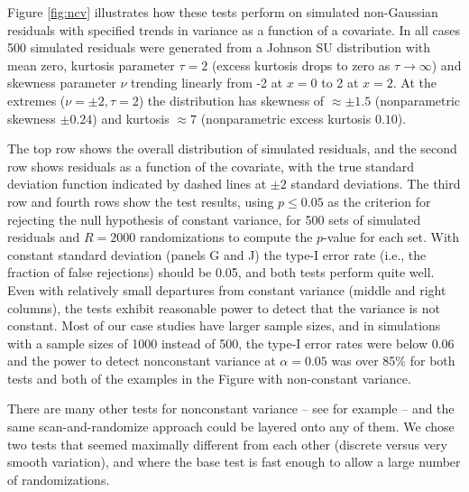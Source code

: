 \documentclass[12pt]{article}
\begin{document}
Figure \ref{fig:ncv} illustrates how these tests perform on simulated non-Gaussian residuals with specified trends in variance as a function of a covariate.
In all cases 500 simulated residuals were generated from a Johnson SU distribution with mean zero, kurtosis parameter $\tau = 2$ (excess kurtosis drops to zero as $\tau \to \infty$)
and skewness parameter $\nu$ trending linearly from -2 at $x=0$ to 2 at $x=2$. At the extremes ($\nu =\pm 2, \tau=2$) the distribution has skewness of $\approx \pm 1.5$
(nonparametric skewness $\pm 0.24$) and kurtosis $\approx 7$ (nonparametric excess kurtosis $0.10$).   

The top row shows the overall distribution of simulated residuals, and the second row shows residuals as a function of the covariate, with the true standard deviation 
function indicated by dashed lines at $\pm 2$ standard deviations. 
The third row and fourth rows show the test results, using $p \le 0.05$ as the criterion for rejecting the null hypothesis
of constant variance, for 500 sets of simulated residuals and $R=2000$ randomizations to compute the $p$-value for each set.  
With constant standard deviation (panels G and J) the type-I error rate (i.e., the fraction of false rejections) should be 0.05, 
and both tests perform quite well. Even with relatively small departures from constant variance (middle and right columns), the tests 
exhibit reasonable power to detect that the variance is not constant. Most of our case studies have larger sample sizes, and in simulations with a sample sizes 
of 1000 instead of 500, the type-I error rates were below $0.06$ and the power to detect nonconstant variance at $\alpha = 0.05$ was 
over 85\% for both tests and both of the examples in the Figure with non-constant variance. 

There are many other tests for nonconstant variance -- see for example \cite{Farrar2024} -- and the same scan-and-randomize approach could
be layered onto any of them. We chose two tests that seemed maximally different from each other (discrete versus very smooth variation), and where the base test
is fast enough to allow a large number of randomizations. 
\end{document}
